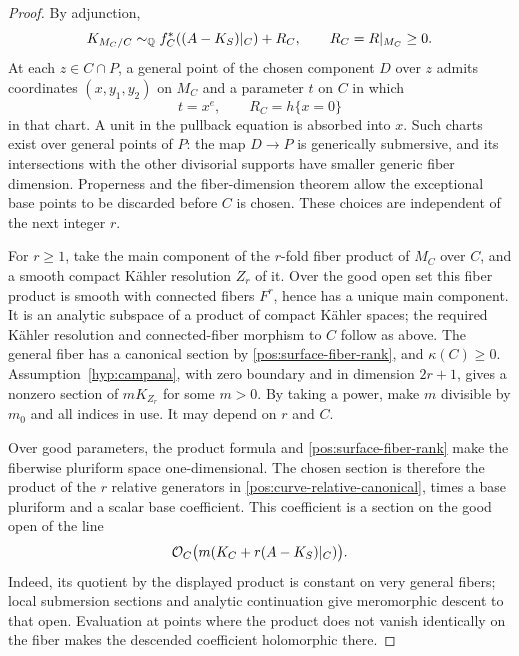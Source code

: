 \begin{proof}
By adjunction,
\begin{equation}\label{pos:curve-relative-canonical}
 K_{M_C/C}\sim_{\mathbb{Q}} f_C^*((A-K_S)|_C)+R_C,
 \qquad R_C=R|_{M_C}\geq0.
\end{equation}
At each \(z\in C\cap P\), a general point of the chosen component
\(D\) over \(z\) admits coordinates \((x,y_1,y_2)\) on \(M_C\)
and a parameter \(t\) on \(C\) in which
\begin{equation}\label{pos:surface-local-chart}
 t=x^e,\qquad R_C=h\{x=0\}
\end{equation}
in that chart. A unit in the pullback equation is absorbed into \(x\).
Such charts exist over general points of \(P\): the map \(D\to P\)
is generically submersive, and its intersections with the other
divisorial supports have smaller generic fiber dimension. Properness
and the fiber-dimension theorem allow the exceptional base points to
be discarded before \(C\) is chosen. These choices are independent of
the next integer \(r\).

For \(r\geq1\), take the main component of the \(r\)-fold fiber
product of \(M_C\) over \(C\), and a smooth compact Kähler resolution
\(Z_r\) of it. Over the good open set this fiber product is smooth
with connected fibers \(F^r\), hence has a unique main component.
It is an analytic subspace of a product of compact Kähler spaces;
the required Kähler resolution and connected-fiber morphism to \(C\)
follow as above. The general fiber has a canonical section by
\eqref{pos:surface-fiber-rank}, and \(\kappa(C)\geq0\).
Assumption~\ref{hyp:campana}, with zero boundary and in dimension
\(2r+1\), gives a nonzero section of \(mK_{Z_r}\) for some \(m>0\).
By taking a power, make \(m\) divisible by \(m_0\) and all indices
in use. It may depend on \(r\) and \(C\).

Over good parameters, the product formula and
\eqref{pos:surface-fiber-rank} make the fiberwise pluriform space
one-dimensional. The chosen section is therefore the product of the
\(r\) relative generators in
\eqref{pos:curve-relative-canonical}, times a base pluriform and a
scalar base coefficient. This coefficient is a section on the good
open of the line
\begin{equation}\label{pos:fiber-power-coefficient-line}
 \mathcal{O}_C\bigl(m(K_C+r(A-K_S)|_C)\bigr).
\end{equation}
Indeed, its quotient by the displayed product is constant on very
general fibers; local submersion sections and analytic continuation
give meromorphic descent to that open. Evaluation at points where the
product does not vanish identically on the fiber makes the descended
coefficient holomorphic there.


\end{proof}
